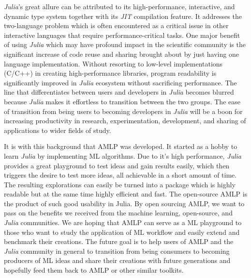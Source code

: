 \documentclass{juliacon}
\begin{document}
\emph{Julia}'s great allure can be attributed to
its high-performance, interactive, and dynamic type system
together with its \emph{JIT} compilation feature. It addresses the
two-language problem which is often encountered as a critical issue
in other interactive languages that require performance-critical tasks.
One major benefit of using \emph{Julia} which
may have profound impact in the scientific community is the significant
increase of code reuse and sharing brought about by just having one language
implementation.  Without resorting to low-level implementations (C/C++) in
creating high-performance libraries, program readability is significantly
improved in \emph{Julia} ecosystem without sacrificing performance. The line
that differentiates between users and developers in \emph{Julia} becomes blurred
because \emph{Julia} makes it effortless to
transition between the two groups. The ease of
transition from being users to becoming developers in \emph{Julia} will be a boon for
increasing productivity in research, experimentation, development, and
sharing of applications to wider fields of study.

\vskip 6pt

It is with this background that AMLP was developed. It started as a hobby to
learn \emph{Julia} by implementing ML algorithms.
Due to it's high performance, \emph{Julia} provides a great
playground to test ideas and gain results easily,
which then triggers the desire to test more ideas, all achievable in a short amount of time.
The resulting explorations can easily be turned into a package which is highly
readable but at the same time highly efficient and fast.  The open-source
AMLP is the product of such good usability in Julia. By open sourcing
AMLP, we want to pass on the benefits we received from the machine
learning, open-source, and \emph{Julia} communities. We are hoping
that AMLP can serve as a ML playground to those who want to
study the application of ML workflow and easily extend and benchmark their
creations. The future goal is to help users of AMLP and the \emph{Julia} community
in general to transition from being consumers to becoming producers of ML ideas
and share their creations with future generations and hopefully feed them back to AMLP
or other similar toolkits.

\vskip 6pt



\end{document}
